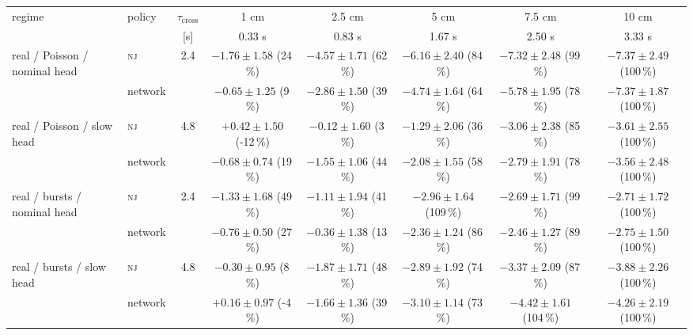 \begin{tabular}{@{}llcccccc@{}}
\toprule
regime & policy & $\tau_{\mathrm{cross}}$ & 1 cm & 2.5 cm & 5 cm & 7.5 cm & 10 cm \\
 & & [s] & 0.33 s & 0.83 s & 1.67 s & 2.50 s & 3.33 s \\
\midrule
real / Poisson / nominal head & \textsc{nj} & 2.4 & $-1.76 \pm 1.58$ (24\,\%) & $-4.57 \pm 1.71$ (62\,\%) & $-6.16 \pm 2.40$ (84\,\%) & $-7.32 \pm 2.48$ (99\,\%) & $-7.37 \pm 2.49$ (100\,\%) \\
 & network &  & $-0.65 \pm 1.25$ (9\,\%) & $-2.86 \pm 1.50$ (39\,\%) & $-4.74 \pm 1.64$ (64\,\%) & $-5.78 \pm 1.95$ (78\,\%) & $-7.37 \pm 1.87$ (100\,\%) \\
real / Poisson / slow head & \textsc{nj} & 4.8 & $+0.42 \pm 1.50$ (-12\,\%) & $-0.12 \pm 1.60$ (3\,\%) & $-1.29 \pm 2.06$ (36\,\%) & $-3.06 \pm 2.38$ (85\,\%) & $-3.61 \pm 2.55$ (100\,\%) \\
 & network &  & $-0.68 \pm 0.74$ (19\,\%) & $-1.55 \pm 1.06$ (44\,\%) & $-2.08 \pm 1.55$ (58\,\%) & $-2.79 \pm 1.91$ (78\,\%) & $-3.56 \pm 2.48$ (100\,\%) \\
real / bursts / nominal head & \textsc{nj} & 2.4 & $-1.33 \pm 1.68$ (49\,\%) & $-1.11 \pm 1.94$ (41\,\%) & $-2.96 \pm 1.64$ (109\,\%) & $-2.69 \pm 1.71$ (99\,\%) & $-2.71 \pm 1.72$ (100\,\%) \\
 & network &  & $-0.76 \pm 0.50$ (27\,\%) & $-0.36 \pm 1.38$ (13\,\%) & $-2.36 \pm 1.24$ (86\,\%) & $-2.46 \pm 1.27$ (89\,\%) & $-2.75 \pm 1.50$ (100\,\%) \\
real / bursts / slow head & \textsc{nj} & 4.8 & $-0.30 \pm 0.95$ (8\,\%) & $-1.87 \pm 1.71$ (48\,\%) & $-2.89 \pm 1.92$ (74\,\%) & $-3.37 \pm 2.09$ (87\,\%) & $-3.88 \pm 2.26$ (100\,\%) \\
 & network &  & $+0.16 \pm 0.97$ (-4\,\%) & $-1.66 \pm 1.36$ (39\,\%) & $-3.10 \pm 1.14$ (73\,\%) & $-4.42 \pm 1.61$ (104\,\%) & $-4.26 \pm 2.19$ (100\,\%) \\
\bottomrule
\end{tabular}
